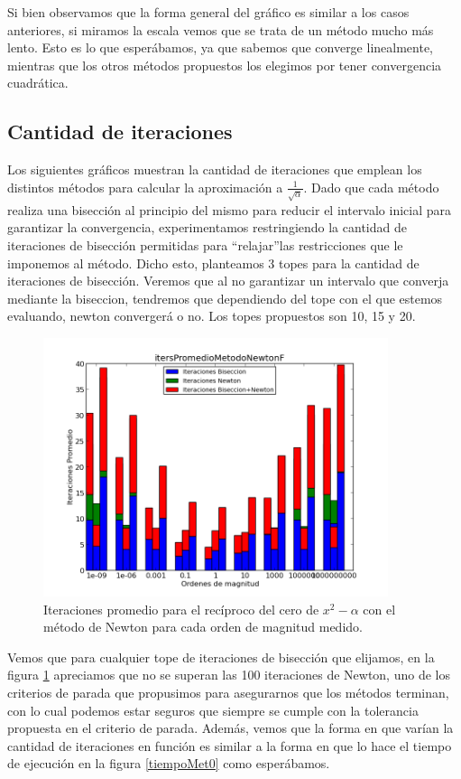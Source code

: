 Si bien observamos que la forma general del gráfico es similar a los casos anteriores, si miramos la escala vemos que se trata de un método mucho más lento. Esto es lo que esperábamos, ya que sabemos que converge linealmente, mientras que los otros métodos propuestos los elegimos por tener convergencia cuadrática.

\subsection{Cantidad de iteraciones}
Los siguientes gráficos muestran la cantidad de iteraciones que emplean los distintos métodos para calcular la aproximación a $\frac{1}{\sqrt{\alpha}}$. Dado que cada método realiza una bisección al principio del mismo para reducir el intervalo inicial para garantizar la convergencia, experimentamos restringiendo la cantidad de iteraciones de bisección permitidas para \textquotedblleft relajar\textquotedblright las restricciones que le imponemos al método. Dicho esto, planteamos 3 topes para la cantidad de iteraciones de bisección. Veremos que al no garantizar un intervalo que converja mediante la biseccion, tendremos que dependiendo del tope con el que estemos evaluando, newton convergerá o no. Los topes propuestos son 10, 15 y 20.

\begin{figure}[H]
  \centering
    \includegraphics[width=0.9\textwidth]{../data/itersPromedioMetodoNewtonF.png}
    \caption{Iteraciones promedio para el recíproco del cero de ${x^2} - \alpha$ con el método de Newton para cada orden de magnitud medido.}
    \label{iters0}
\end{figure}

Vemos que para cualquier tope de iteraciones de bisección que elijamos, en la figura \ref{iters0} apreciamos que no se superan las 100 iteraciones de Newton, uno de los criterios de parada que propusimos para asegurarnos que los métodos terminan, con lo cual podemos estar seguros que siempre se cumple con la tolerancia propuesta en el criterio de parada.
 Además, vemos que la forma en que varían la cantidad de iteraciones en función es similar a la forma en que lo hace el tiempo de ejecución en la figura \ref{tiempoMet0} como esperábamos.


